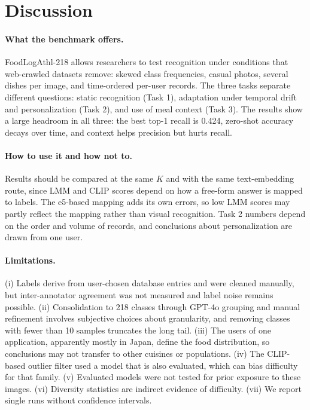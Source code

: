 \documentclass[sigconf, nonacm]{acmart}
\begin{document}
\section{Discussion}
\paragraph{What the benchmark offers.} FoodLogAthl-218 allows researchers to test recognition under conditions that web-crawled datasets remove: skewed class frequencies, casual photos, several dishes per image, and time-ordered per-user records. The three tasks separate different questions: static recognition (Task 1), adaptation under temporal drift and personalization (Task 2), and use of meal context (Task 3). The results show a large headroom in all three: the best top-1 recall is 0.424, zero-shot accuracy decays over time, and context helps precision but hurts recall.

\paragraph{How to use it and how not to.} Results should be compared at the same $K$ and with the same text-embedding route, since LMM and CLIP scores depend on how a free-form answer is mapped to labels. The e5-based mapping adds its own errors, so low LMM scores may partly reflect the mapping rather than visual recognition. Task 2 numbers depend on the order and volume of records, and conclusions about personalization are drawn from one user.

\paragraph{Limitations.} (i) Labels derive from user-chosen database entries and were cleaned manually, but inter-annotator agreement was not measured and label noise remains possible. (ii) Consolidation to 218 classes through GPT-4o grouping and manual refinement involves subjective choices about granularity, and removing classes with fewer than 10 samples truncates the long tail. (iii) The users of one application, apparently mostly in Japan, define the food distribution, so conclusions may not transfer to other cuisines or populations. (iv) The CLIP-based outlier filter used a model that is also evaluated, which can bias difficulty for that family. (v) Evaluated models were not tested for prior exposure to these images. (vi) Diversity statistics are indirect evidence of difficulty. (vii) We report single runs without confidence intervals.
\end{document}
